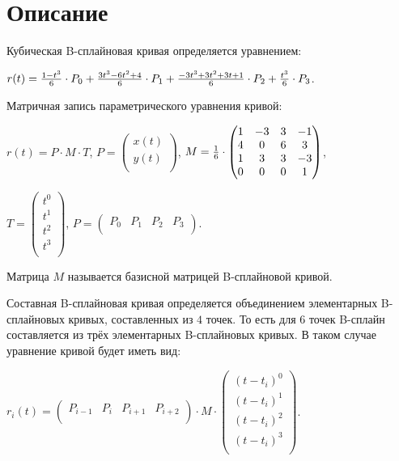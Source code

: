\section{Описание}
Кубическая B-сплайновая кривая определяется уравнением:

$r(t) = {{{1 - t} ^ 3} \over 6} \cdot P_0 + {{3 t ^ 3 - 6 t ^ 2 + 4} \over 6} \cdot P_1 + {{-3 t ^ 3 + 3 t ^ 2 + 3 t + 1} \over 6} \cdot P_2 + {{t ^ 3} \over 6} \cdot P_3$.

Матричная запись параметрического уравнения кривой:

$r(t) = P \cdot M \cdot T$,
$P =
\begin{pmatrix}
    x(t) \\
    y(t) \\
\end{pmatrix}$,
$M = {1 \over 6} \cdot
\begin{pmatrix}
    1 & -3 & 3 & -1 \\
    4 & 0 & 6 & 3 \\
    1 & 3 & 3 & -3 \\
    0 & 0 & 0 & 1 \\
\end{pmatrix}$,

$T =
\begin{pmatrix}
    t^0 \\
    t^1 \\
    t^2 \\
    t^3 \\
\end{pmatrix}$,
$P =
\begin{pmatrix}
    P_0 & P_1 & P_2 & P_3 \\
\end{pmatrix}$.

Матрица $M$ называется базисной матрицей B-сплайновой кривой.

Составная B-сплайновая кривая определяется объединением элементарных B-сплайновых кривых, составленных из $4$ точек. То есть для $6$ точек B-сплайн составляется из трёх элементарных B-сплайновых кривых. В таком случае уравнение кривой будет иметь вид:

$r_i(t) =
\begin{pmatrix}
    P_{i - 1} & P_{i} & P_{i + 1} & P_{i + 2} \\
\end{pmatrix}
\cdot M \cdot
\begin{pmatrix}
    (t - t_i) ^ 0 \\
    (t - t_i) ^ 1 \\
    (t - t_i) ^ 2 \\
    (t - t_i) ^ 3 \\
\end{pmatrix}$.
\pagebreak
